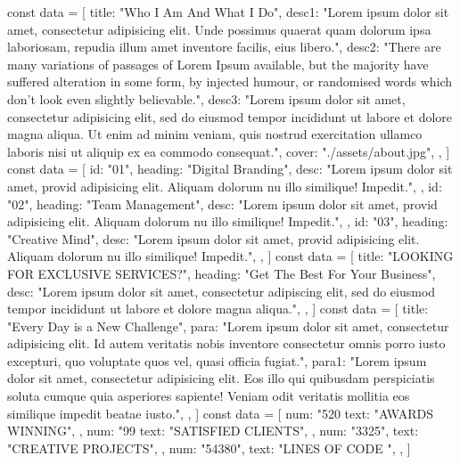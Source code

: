 const data = [
    {
      title: "Who I Am And What I Do",
      desc1: "Lorem ipsum dolor sit amet, consectetur adipisicing elit. Unde possimus quaerat quam dolorum ipsa laboriosam, repudia illum amet inventore facilis, eius libero.",
      desc2: "There are many variations of passages of Lorem Ipsum available, but the majority have suffered alteration in some form, by injected humour, or randomised words which don't look even slightly believable.",
      desc3: "Lorem ipsum dolor sit amet, consectetur adipisicing elit, sed do eiusmod tempor incididunt ut labore et dolore magna aliqua. Ut enim ad minim veniam, quis nostrud exercitation ullamco laboris nisi ut aliquip ex ea commodo consequat.",
      cover: "./assets/about.jpg",
    },
  ]
   const data = [
    {
      id: "01",
      heading: "Digital Branding",
      desc: "Lorem ipsum dolor sit amet, provid adipisicing elit. Aliquam dolorum nu illo similique! Impedit.",
    },
    {
      id: "02",
      heading: "Team Management",
      desc: "Lorem ipsum dolor sit amet, provid adipisicing elit. Aliquam dolorum nu illo similique! Impedit.",
    },
    {
      id: "03",
      heading: "Creative Mind",
      desc: "Lorem ipsum dolor sit amet, provid adipisicing elit. Aliquam dolorum nu illo similique! Impedit.",
    },
  ]
    const data = [
    {
      title: "LOOKING FOR EXCLUSIVE SERVICES?",
      heading: "Get The Best For Your Business",
      desc: "Lorem ipsum dolor sit amet, consectetur adipiscing elit, sed do eiusmod tempor incididunt ut labore et dolore magna aliqua.",
    },
  ]
 const data = [
    {
      title: "Every Day is a New Challenge",
      para: "Lorem ipsum dolor sit amet, consectetur adipisicing elit. Id autem veritatis nobis inventore consectetur omnis porro iusto excepturi, quo voluptate quos vel, quasi officia fugiat.",
      para1: "Lorem ipsum dolor sit amet, consectetur adipisicing elit. Eos illo qui quibusdam perspiciatis soluta cumque quia asperiores sapiente! Veniam odit veritatis mollitia eos similique impedit beatae iusto.",
    },
  ]
  const data = [
    {
      num: "520%
      text: "AWARDS WINNING",
    },
    {
      num: "99%
      text: "SATISFIED CLIENTS",
    },
    {
      num: "3325",
      text: "CREATIVE PROJECTS",
    },
    {
      num: "54380",
      text: "LINES OF CODE ",
    },
  ]